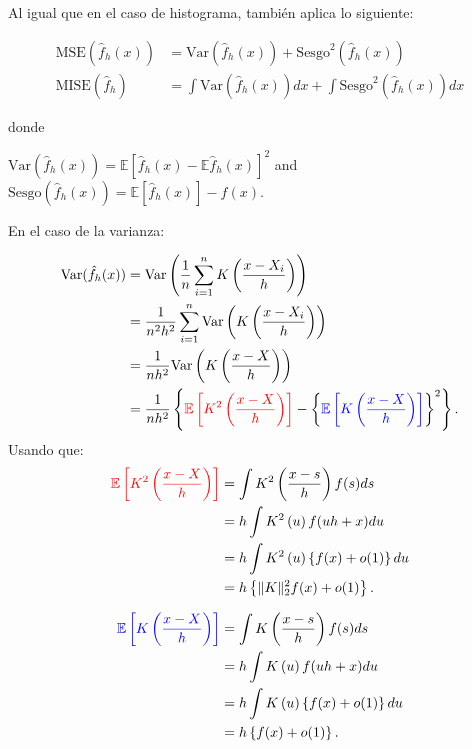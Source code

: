 \documentclass[
  12pt,
]{book}
\theoremstyle{definition}
\theoremstyle{definition}
\theoremstyle{definition}
\theoremstyle{definition}
\theoremstyle{remark}
\begin{document}
Al igual que en el caso de histograma, también aplica lo siguiente:

\begin{align*}
\mathrm{MSE}(\hat{f}_{h}(x)) & =\mathrm{Var}(\hat{f}_{h}(x))+\mathrm{Sesgo}^{2} (\hat{f}_{h}(x))            \\
\mathrm{MISE}(\hat{f}_{h})   & =\int\mathrm{Var}(\hat{f}_{h}(x))dx+\int\mathrm{Sesgo}^{2}(\hat{f}_{h}(x))dx
\end{align*}

donde

\(\mathrm{Var}\left(\hat{f}_{h}(x)\right)=\mathbb{E}\left[\hat{f}_{h}(x)-\mathbb{E}\hat{f}_{h}(x)\right]^{2}\) and \(\mathrm{Sesgo}\left(\hat{f}_{h}(x)\right)=\mathbb{E}\left[\hat{f}_{h}(x)\right]-f(x)\).

En el caso de la varianza:

\begin{align*}
\mathrm{Var}(\hat{f}_{h}(x))
& =\mathrm{Var}\left(\frac{1}{n}\sum_{i=1}^{n}K\left(\frac{x-X_{i}}{h}\right)\right)          \\
& =\frac{1}{n^{2}h^{2}}\sum_{i=1}^{n}\mathrm{Var}\left(K\left(\frac{x-X_{i}}{h}\right)\right) \\
& =\frac{1}{nh^{2}}\mathrm{Var}\left(K\left(\frac{x-X}{h}\right)\right)                       \\
& =\frac{1}{nh^{2}}\left\{
\textcolor{red}{\mathbb{E}\left[K^{2}\left(\frac{x-X}{h}\right)\right]}
-\left\{
\textcolor{blue}{\mathbb{E}\left[K\left(\frac{x-X}{h}\right)\right]}
\right\}^{2}
\right\}.
\end{align*} Usando que: \begin{align*}
\textcolor{red}{\mathbb{E}\left[K^{2}\left(\frac{x-X}{h}\right)\right]}
& =\int K^{2}\left(\frac{x-s}{h}\right)f(s)ds            \\
& =h\int K^{2}\left(u\right)f(uh+x)du                    \\
& =h\int K^{2}\left(u\right)\left\{ f(x)+o(1)\right\} du \\
& =h\left\{ \Vert K\Vert_{2}^{2}f(x)+o(1)\right\} .
\end{align*}

\begin{align*}
\textcolor{blue}{\mathbb{E}\left[K\left(\frac{x-X}{h}\right)\right]}
& =\int K\left(\frac{x-s}{h}\right)f(s)ds            \\
& = h\int K\left(u\right)f(uh+x)du                    \\
& =h\int K\left(u\right)\left\{ f(x)+o(1)\right\} du \\
& =h\left\{f(x)+o(1)\right\} .
\end{align*}
\end{document}
